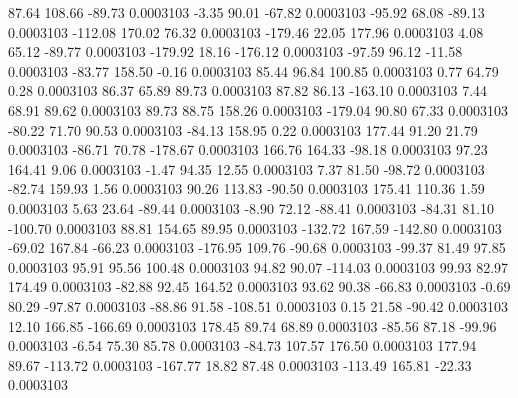        87.64      108.66      -89.73     0.0003103
       -3.35       90.01      -67.82     0.0003103
      -95.92       68.08      -89.13     0.0003103
     -112.08      170.02       76.32     0.0003103
     -179.46       22.05      177.96     0.0003103
        4.08       65.12      -89.77     0.0003103
     -179.92       18.16     -176.12     0.0003103
      -97.59       96.12      -11.58     0.0003103
      -83.77      158.50       -0.16     0.0003103
       85.44       96.84      100.85     0.0003103
        0.77       64.79        0.28     0.0003103
       86.37       65.89       89.73     0.0003103
       87.82       86.13     -163.10     0.0003103
        7.44       68.91       89.62     0.0003103
       89.73       88.75      158.26     0.0003103
     -179.04       90.80       67.33     0.0003103
      -80.22       71.70       90.53     0.0003103
      -84.13      158.95        0.22     0.0003103
      177.44       91.20       21.79     0.0003103
      -86.71       70.78     -178.67     0.0003103
      166.76      164.33      -98.18     0.0003103
       97.23      164.41        9.06     0.0003103
       -1.47       94.35       12.55     0.0003103
        7.37       81.50      -98.72     0.0003103
      -82.74      159.93        1.56     0.0003103
       90.26      113.83      -90.50     0.0003103
      175.41      110.36        1.59     0.0003103
        5.63       23.64      -89.44     0.0003103
       -8.90       72.12      -88.41     0.0003103
      -84.31       81.10     -100.70     0.0003103
       88.81      154.65       89.95     0.0003103
     -132.72      167.59     -142.80     0.0003103
      -69.02      167.84      -66.23     0.0003103
     -176.95      109.76      -90.68     0.0003103
      -99.37       81.49       97.85     0.0003103
       95.91       95.56      100.48     0.0003103
       94.82       90.07     -114.03     0.0003103
       99.93       82.97      174.49     0.0003103
      -82.88       92.45      164.52     0.0003103
       93.62       90.38      -66.83     0.0003103
       -0.69       80.29      -97.87     0.0003103
      -88.86       91.58     -108.51     0.0003103
        0.15       21.58      -90.42     0.0003103
       12.10      166.85     -166.69     0.0003103
      178.45       89.74       68.89     0.0003103
      -85.56       87.18      -99.96     0.0003103
       -6.54       75.30       85.78     0.0003103
      -84.73      107.57      176.50     0.0003103
      177.94       89.67     -113.72     0.0003103
     -167.77       18.82       87.48     0.0003103
     -113.49      165.81      -22.33     0.0003103
